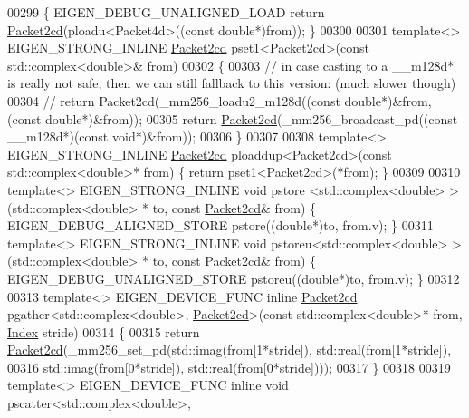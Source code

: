 \begin{DoxyCode}
00299 \{ EIGEN\_DEBUG\_UNALIGNED\_LOAD \textcolor{keywordflow}{return} \hyperlink{struct_eigen_1_1internal_1_1_packet2cd}{Packet2cd}(ploadu<Packet4d>((\textcolor{keyword}{const} \textcolor{keywordtype}{double}*)from)); \}
00300 
00301 \textcolor{keyword}{template}<> EIGEN\_STRONG\_INLINE \hyperlink{struct_eigen_1_1internal_1_1_packet2cd}{Packet2cd} pset1<Packet2cd>(\textcolor{keyword}{const} std::complex<double>& from)
00302 \{
00303   \textcolor{comment}{// in case casting to a \_\_m128d* is really not safe, then we can still fallback to this version: (much
       slower though)}
00304 \textcolor{comment}{//   return Packet2cd(\_mm256\_loadu2\_m128d((const double*)&from,(const double*)&from));}
00305     \textcolor{keywordflow}{return} \hyperlink{struct_eigen_1_1internal_1_1_packet2cd}{Packet2cd}(\_mm256\_broadcast\_pd((\textcolor{keyword}{const} \_\_m128d*)(\textcolor{keyword}{const} \textcolor{keywordtype}{void}*)&from));
00306 \}
00307 
00308 \textcolor{keyword}{template}<> EIGEN\_STRONG\_INLINE \hyperlink{struct_eigen_1_1internal_1_1_packet2cd}{Packet2cd} ploaddup<Packet2cd>(\textcolor{keyword}{const} std::complex<double>* from) \{ \textcolor{keywordflow}{
      return} pset1<Packet2cd>(*from); \}
00309 
00310 \textcolor{keyword}{template}<> EIGEN\_STRONG\_INLINE \textcolor{keywordtype}{void} pstore <std::complex<double> >(std::complex<double> *   to, \textcolor{keyword}{const} 
      \hyperlink{struct_eigen_1_1internal_1_1_packet2cd}{Packet2cd}& from) \{ EIGEN\_DEBUG\_ALIGNED\_STORE pstore((\textcolor{keywordtype}{double}*)to, from.v); \}
00311 \textcolor{keyword}{template}<> EIGEN\_STRONG\_INLINE \textcolor{keywordtype}{void} pstoreu<std::complex<double> >(std::complex<double> *   to, \textcolor{keyword}{const} 
      \hyperlink{struct_eigen_1_1internal_1_1_packet2cd}{Packet2cd}& from) \{ EIGEN\_DEBUG\_UNALIGNED\_STORE pstoreu((\textcolor{keywordtype}{double}*)to, from.v); \}
00312 
00313 \textcolor{keyword}{template}<> EIGEN\_DEVICE\_FUNC \textcolor{keyword}{inline} \hyperlink{struct_eigen_1_1internal_1_1_packet2cd}{Packet2cd} pgather<std::complex<double>, 
      \hyperlink{struct_eigen_1_1internal_1_1_packet2cd}{Packet2cd}>(\textcolor{keyword}{const} std::complex<double>* from, \hyperlink{namespace_eigen_a62e77e0933482dafde8fe197d9a2cfde}{Index} stride)
00314 \{
00315   \textcolor{keywordflow}{return} \hyperlink{struct_eigen_1_1internal_1_1_packet2cd}{Packet2cd}(\_mm256\_set\_pd(std::imag(from[1*stride]), std::real(from[1*stride]),
00316                  std::imag(from[0*stride]), std::real(from[0*stride])));
00317 \}
00318 
00319 \textcolor{keyword}{template}<> EIGEN\_DEVICE\_FUNC \textcolor{keyword}{inline} \textcolor{keywordtype}{void} pscatter<std::complex<double>, 

\end{DoxyCode}
